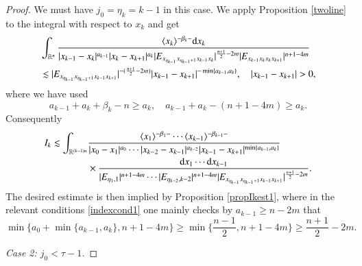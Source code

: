 \documentclass[11pt,reqno]{amsart}
\def\d{{\rm d}}
\numberwithin{equation}{section}
\theoremstyle{definition}
\begin{document}
\begin{proof}
	We must have $j_0=\eta_k=k-1$ in this case. We apply Proposition \ref{twoline} to the integral with respect to $x_k$ and get
	\begin{equation*}\label{intxk}
		\begin{split}
			&\int_{\mathbb{R}^n}\frac{\langle x_k\rangle^{-\beta_k-}\d x_k}{|x_{k-1}-x_k|^{a_{k-1}}|x_k-x_{k+1}|^{a_k}|E_{x_{\eta_{k-1}}x_{\eta_{k-1}+1}x_{k-1}x_k}|^{\frac{n+1}{2}-2m}|E_{x_{k-1}x_kx_kx_{k+1}}|^{n+1-4m}}\\
			&\lesssim|E_{x_{\eta_{k-1}}x_{\eta_{k-1}+1}x_{k-1}x_{k+1}}|^{-(\frac{n+1}{2}-2m)}|x_{k-1}-x_{k+1}|^{-\min\{a_{k-1},a_k\}},\quad|x_{k-1}-x_{k+1}|>0,
		\end{split}
	\end{equation*}
	where we have used
	\begin{equation*}
		a_{k-1}+a_k+\beta_k-n\geq a_{k},\quad a_{k-1}+a_k-(n+1-4m)\geq a_k.
	\end{equation*}
	Consequently
	\begin{equation*}
		\begin{split}
			I_k\lesssim\int_{\mathbb{R}^{(k-1)n}}&\frac{\langle x_1\rangle^{-\beta_1-}\cdots\langle x_{k-1}\rangle^{-\beta_{k-1}-}}{|x_0-x_1|^{a_0}\cdots|x_{k-2}-x_{k-1}|^{a_{k-2}}|x_{k-1}-x_{k+1}|^{\min\{a_{k-1},a_k\}}}\\
			&\times\frac{\d x_1\cdots \d x_{k-1}}{|E_{\eta_1,1}|^{n+1-4m}\cdots|E_{\eta_{k-2},k-2}|^{n+1-4m}|E_{x_{\eta_{k-1}}x_{\eta_{k-1}+1}x_{k-1}x_{k+1}}|^{\frac{n+1}{2}-2m}}.
		\end{split}
	\end{equation*}
	The desired estimate is then implied by Proposition \ref{propIkest1}, where in the relevant conditions \eqref{indexcond1} one mainly checks by $a_{k-1}\geq n-2m$ that
	\begin{equation*}
		\min\{a_0+\min\{a_{k-1},a_k\},n+1-4m\}\geq\min\{\mbox{$\frac{n-1}{2}$},n+1-4m\}\geq\mbox{$\frac{n+1}{2}$}-2m.
	\end{equation*}
	
	\noindent\emph{Case 2: $j_0<\tau-1$.}
	

\end{proof}
\end{document}
